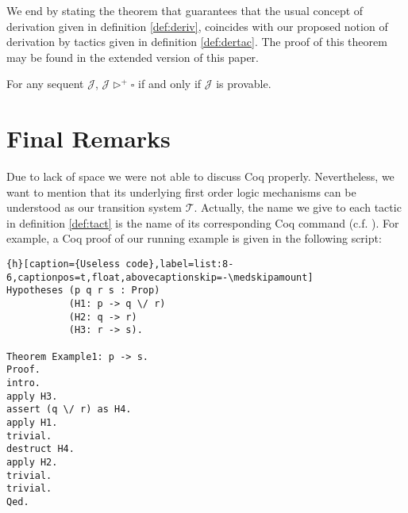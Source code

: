 \documentclass[a4paper,UKenglish]{lipics}
\newcommand{\J}{\mathcal{J}}
\begin{document}
We end by stating the theorem that guarantees that the usual concept of derivation given in definition \ref{def:deriv}, coincides with our proposed notion of derivation by tactics given in definition \ref{def:dertac}. The proof of this theorem may be found in the extended version of this paper.

\begin{theorem}\label{thm:equiv}
  For any sequent $\J$, $\J\rhd^+\square$ if and only if $\J$ is provable.
\end{theorem}

\section{Final Remarks}
Due to lack of space we were not able to discuss {\sc Coq} properly. Nevertheless, we want to mention that its underlying first order logic mechanisms can be understood as our transition system $\mathcal{T}$. Actually, the name we give to each tactic in definition \ref{def:tact} is the name of its corresponding {\sc Coq} command (c.f. \cite{bertot}). For example, a {\sc Coq} proof of our running example is given in the following script: 

\begin{lstlisting}{h}[caption={Useless code},label=list:8-6,captionpos=t,float,abovecaptionskip=-\medskipamount]
Hypotheses (p q r s : Prop)
           (H1: p -> q \/ r) 
           (H2: q -> r)
           (H3: r -> s). 
         
Theorem Example1: p -> s.
Proof.
intro.
apply H3.
assert (q \/ r) as H4.
apply H1.
trivial.
destruct H4.
apply H2.
trivial.
trivial.
Qed.
\end{lstlisting}
\end{document}
